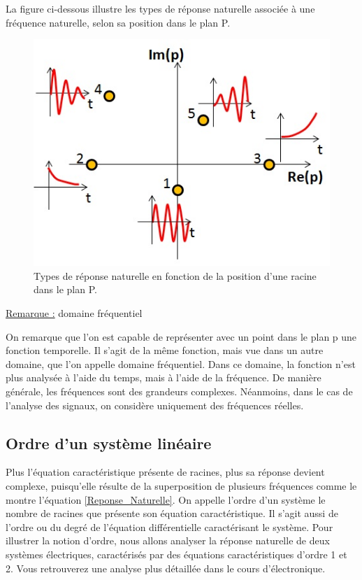 \documentclass[]{report}
\begin{document}
	La figure ci-dessous illustre les types de réponse naturelle associée à une fréquence naturelle, selon sa position dans le plan P.
	\begin{figure}[h!]
		\centering
		\includegraphics[scale=0.5]{images/reponse_vs_p.jpg} 
		\caption{Types de réponse naturelle en fonction de la position d'une racine dans le plan P.}	
		\label{Fig:reponse_vs_p}
	\end{figure}
	
	\underline{Remarque :} domaine fréquentiel
	
	On remarque que l'on est capable de représenter avec un point dans le
	plan p une fonction temporelle. Il s'agit de la même fonction, mais vue
	dans un autre domaine, que l'on appelle domaine fréquentiel. Dans ce domaine, la fonction n'est plus analysée à l'aide du temps, mais à l'aide de la fréquence. De manière générale, les fréquences sont des grandeurs complexes. Néanmoins, dans le cas de l'analyse des signaux, on considère uniquement des fréquences réelles.
	
	
	\subsection{Ordre d'un système linéaire}
	
	Plus l'équation caractéristique présente de racines, plus sa réponse
	devient complexe, puisqu'elle résulte de la superposition de plusieurs
	fréquences  comme le montre l'équation \ref{Reponse_Naturelle}. On appelle l'ordre
	d'un système le nombre de racines que présente son équation
	caractéristique. Il s'agit aussi de l'ordre ou du degré de l'équation
	différentielle caractérisant le système. Pour illustrer la notion
	d'ordre, nous allons analyser la réponse naturelle de deux systèmes
	électriques, caractérisés par des équations caractéristiques d'ordre 1 et 2. Vous retrouverez une analyse plus détaillée dans le cours d'électronique.
	
\end{document}
